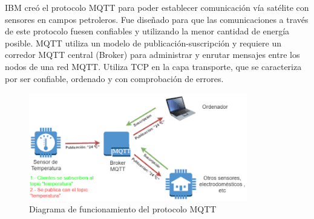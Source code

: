 IBM creó el protocolo MQTT para poder establecer comunicación vía satélite con sensores en campos petroleros. Fue diseñado para que las comunicaciones a través de este protocolo fuesen confiables y utilizando la menor cantidad de energía posible. MQTT utiliza un modelo de publicación-suscripción y requiere un corredor MQTT central (Broker) para administrar y enrutar mensajes entre los nodos de una red MQTT. Utiliza TCP en la capa transporte, que se caracteriza por ser confiable, ordenado y con comprobación de errores.\cite{iotprocolslinkedin}\\

\begin{figure}[!htb]
\centering
\includegraphics[width=0.85\textwidth]{./Figuras/mqtt.png}
\caption{\label{fig:mqttprotocol}Diagrama de funcionamiento del protocolo MQTT}
\vspace*{-10pt}
\end{figure}

